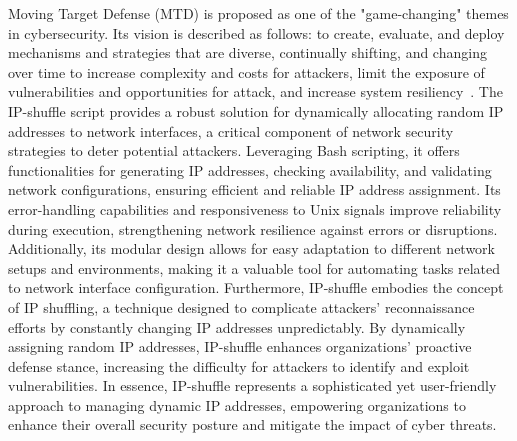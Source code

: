 Moving Target Defense (MTD) is proposed as one of the "game-changing" themes in cybersecurity. Its vision is described as follows: to create, evaluate, and deploy mechanisms and strategies that are diverse, continually shifting, and changing over time to increase complexity and costs for attackers, limit the exposure of vulnerabilities and opportunities for attack, and increase system resiliency~\cite{cai2016introduction}.
The IP-shuffle script provides a robust solution for dynamically allocating random IP addresses to network interfaces, a critical component of network security strategies to deter potential attackers. Leveraging Bash scripting, it offers functionalities for generating IP addresses, checking availability, and validating network configurations, ensuring efficient and reliable IP address assignment. Its error-handling capabilities and responsiveness to Unix signals improve reliability during execution, strengthening network resilience against errors or disruptions. Additionally, its modular design allows for easy adaptation to different network setups and environments, making it a valuable tool for automating tasks related to network interface configuration.
Furthermore, IP-shuffle embodies the concept of IP shuffling, a technique designed to complicate attackers' reconnaissance efforts by constantly changing IP addresses unpredictably. By dynamically assigning random IP addresses, IP-shuffle enhances organizations' proactive defense stance, increasing the difficulty for attackers to identify and exploit vulnerabilities. In essence, IP-shuffle represents a sophisticated yet user-friendly approach to managing dynamic IP addresses, empowering organizations to enhance their overall security posture and mitigate the impact of cyber threats.